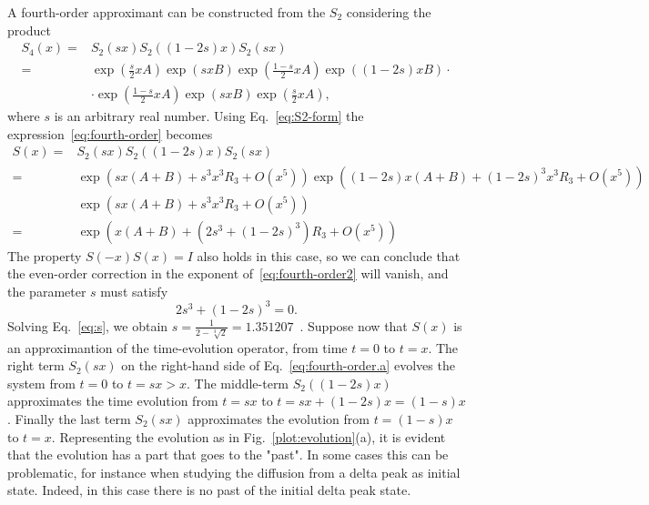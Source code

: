 A fourth-order approximant can be constructed from the $S_2$ considering the product
\begin{subequations} \label{eq:fourth-order}
\begin{align} \label{eq:fourth-order.a}
S_4(x) = & S_2(sx) S_2((1-2s)x) S_2(sx) \\
= & \exp\left({\frac{s}{2}xA}\right) \exp\left({sxB}\right) \exp\left({\frac{1-s}{2}xA}\right) \exp\left({(1-2s)xB}\right) \cdot \nonumber \\
& \cdot \exp\left({\frac{1-s}{2}xA}\right) \exp\left({sxB}\right) \exp\left({\frac{s}{2}xA}\right),
\end{align}
\end{subequations}
where $s$ is an arbitrary real number. Using Eq.~\eqref{eq:S2-form} the expression~\eqref{eq:fourth-order} becomes
\begin{subequations} \label{eq:fourth-order2}
\begin{align} \label{eq:fourth-order2}
S(x) = & S_2(sx) S_2((1-2s)x) S_2(sx)	 \\
= & \exp\left({sx(A+B) + s^3x^3R_3 + O(x^5)}\right) \exp\left({(1-2s)x(A+B) + (1-2s)^3x^3R_3 + O(x^5)}\right) \nonumber \\
& \exp\left({sx(A+B) + s^3x^3R_3 + O(x^5)}\right) \\
= & \exp\left({x(A+B)+(2s^3+(1-2s)^3)R_3+O(x^5)}\right) \label{eq:fourth-order2.3}
\end{align}
\end{subequations}
The property $S(-x)S(x) = I$ also holds in this case, so we can conclude that the even-order correction in the exponent of~\eqref{eq:fourth-order2} will vanish, and the parameter $s$ must satisfy
\begin{equation} \label{eq:s}
2s^3 + (1-2s)^3 = 0.
\end{equation}
Solving Eq.~\eqref{eq:s}, we obtain $s = \frac{1}{2-\sqrt[3]{2}} = 1.351207$~. Suppose now that $S(x)$ is an approximantion of the time-evolution operator, from time $t=0$ to $t=x$. The right term $S_2(sx)$ on the right-hand side of Eq.~\eqref{eq:fourth-order.a} evolves the system from $t=0$ to $t=sx>x$. The middle-term $S_2((1-2s)x)$ approximates the time evolution from $t=sx$ to $t=sx + (1-2s)x = (1-s)x$. Finally the last term $S_2(sx)$ approximates the evolution from $t=(1-s)x$ to $t=x$. Representing the evolution as in Fig.~\ref{plot:evolution}(a), it is evident that the evolution has a part that goes to the "past". In some cases this can be problematic, for instance when studying the diffusion from a delta peak as initial state. Indeed, in this case there is no past of the initial delta peak state. 


